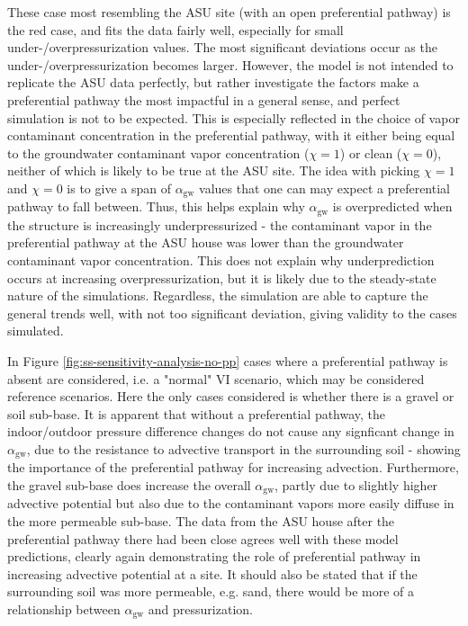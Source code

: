 \documentclass[journal=esthag,manuscript=article]{achemso}
\begin{document}
These case most resembling the ASU site (with an open preferential pathway) is the red case, and fits the data fairly well, especially for small under-/overpressurization values.
The most significant deviations occur as the under-/overpressurization becomes larger.
However, the model is not intended to replicate the ASU data perfectly, but rather investigate the factors make a preferential pathway the most impactful in a general sense, and perfect simulation is not to be expected.
This is especially reflected in the choice of vapor contaminant concentration in the preferential pathway, with it either being equal to the groundwater contaminant vapor concentration ($\chi=1$) or clean ($\chi=0$), neither of which is likely to be true at the ASU site.
The idea with picking $\chi=1$ and $\chi=0$ is to give a span of $\alpha_\mathrm{gw}$ values that one can may expect a preferential pathway to fall between.
Thus, this helps explain why $\alpha_\mathrm{gw}$ is overpredicted when the structure is increasingly underpressurized - the contaminant vapor in the preferential pathway at the ASU house was lower than the groundwater contaminant vapor concentration.
This does not explain why underprediction occurs at increasing overpressurization, but it is likely due to the steady-state nature of the simulations.
Regardless, the simulation are able to capture the general trends well, with not too significant deviation, giving validity to the cases simulated.\par

In Figure \ref{fig:ss-sensitivity-analysis-no-pp} cases where a preferential pathway is absent are considered, i.e. a "normal" VI scenario, which may be considered reference scenarios.
Here the only cases considered is whether there is a gravel or soil sub-base.
It is apparent that without a preferential pathway, the indoor/outdoor pressure difference changes do not cause any signficant change in $\alpha_\mathrm{gw}$, due to the resistance to advective transport in the surrounding soil - showing the importance of the preferential pathway for increasing advection.
Furthermore, the gravel sub-base does increase the overall $\alpha_\mathrm{gw}$, partly due to slightly higher advective potential but also due to the contaminant vapors more easily diffuse in the more permeable sub-base.
The data from the ASU house after the preferential pathway there had been close agrees well with these model predictions, clearly again demonstrating the role of preferential pathway in increasing advective potential at a site.
It should also be stated that if the surrounding soil was more permeable, e.g. sand, there would be more of a relationship between $\alpha_\mathrm{gw}$ and pressurization.\par
\end{document}
